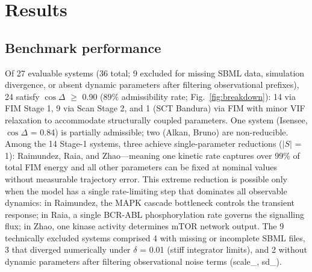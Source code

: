 \documentclass[pdflatex,sn-nature]{sn-jnl}
\begin{document}
\section{Results}\label{sec:results}


\subsection{Benchmark performance}\label{sec:benchmark}


Of 27 evaluable systems (36 total; 9 excluded for missing SBML data, simulation divergence, or absent dynamic parameters after filtering observational prefixes), 24 satisfy $\cos\Delta$ $\ge$ 0.90 (89\% admissibility rate; Fig.~\ref{fig:breakdown}): 14 via FIM Stage 1, 9 via Scan Stage 2, and 1 (SCT Bandura) via FIM with minor VIF relaxation to accommodate structurally coupled parameters. One system (Isensee, $\cos\Delta$ = 0.84) is partially admissible; two (Alkan, Bruno) are non-reducible. Among the 14 Stage-1 systems, three achieve single-parameter reductions ($|S|$ = 1): Raimundez, Raia, and Zhao---meaning one kinetic rate captures over 99\% of total FIM energy and all other parameters can be fixed at nominal values without measurable trajectory error. This extreme reduction is possible only when the model has a single rate-limiting step that dominates all observable dynamics: in Raimundez, the MAPK cascade bottleneck controls the transient response; in Raia, a single BCR-ABL phosphorylation rate governs the signalling flux; in Zhao, one kinase activity determines mTOR network output. The 9 technically excluded systems comprised 4 with missing or incomplete SBML files, 3 that diverged numerically under $\delta$ = 0.01 (stiff integrator limits), and 2 without dynamic parameters after filtering observational noise terms (scale\_, sd\_).
\end{document}
